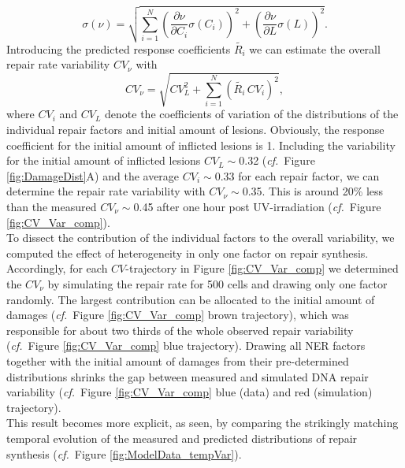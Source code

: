 \begin{equation}
\sigma(\nu) = \sqrt{\sum_{i = 1}^{N} \left(\frac{\partial \nu}{\partial C_i}\sigma(C_i) \right)^2 + \left(\frac{\partial \nu}{\partial L}\sigma(L)\right)^2 }.
\label{eqn:lawoferrorPropagation}
\end{equation} 
Introducing the predicted response coefficients $\tilde{R_i}$ we can estimate the overall repair rate variability $CV_{\nu}$ with
\begin{equation}
CV_{\nu} = \sqrt{CV_{L}^2 + \sum_{i = 1}^{N}(\tilde{R_i} \, CV_i)^2},
\label{eqn:lawOfErrorPropI}
\end{equation}
where $CV_{i}$ and $CV_L$ denote the coefficients of variation of the distributions of the individual repair factors and initial amount of lesions. Obviously, the response coefficient for the initial amount of inflicted lesions is 1. Including the variability for the initial amount of inflicted lesions $CV_L\sim$0.32 (\textit{cf.}\ Figure \ref{fig:DamageDist}A) and the average $CV_i \sim$0.33 for each repair factor, we can determine the repair rate variability with $CV_{\nu} \sim$0.35. This is around 20\% less than the measured $CV_{\nu} \sim$0.45 after one hour post UV-irradiation (\textit{cf.}\ Figure \ref{fig:CV_Var_comp}).\\
To dissect the contribution of the individual factors to the
overall variability, we computed the effect of heterogeneity in only one factor on repair synthesis. Accordingly, for each $CV$-trajectory in Figure \ref{fig:CV_Var_comp} we determined the $CV_{\nu}$ by simulating the repair rate for 500 cells and drawing only one factor randomly. The largest contribution can be allocated to the initial amount of damages (\textit{cf.}\ Figure \ref{fig:CV_Var_comp} brown trajectory), which was responsible for about two thirds of the whole observed repair variability (\textit{cf.}\ Figure \ref{fig:CV_Var_comp} blue trajectory). Drawing all NER factors together with the initial amount of damages from their pre-determined distributions shrinks the gap between measured and simulated DNA repair variability (\textit{cf.}\ Figure \ref{fig:CV_Var_comp} blue (data) and red (simulation) trajectory).\\
This result becomes more explicit, as seen, by comparing the strikingly matching temporal evolution of the measured and predicted distributions of repair synthesis (\textit{cf.}\ Figure \ref{fig:ModelData_tempVar}).\\
